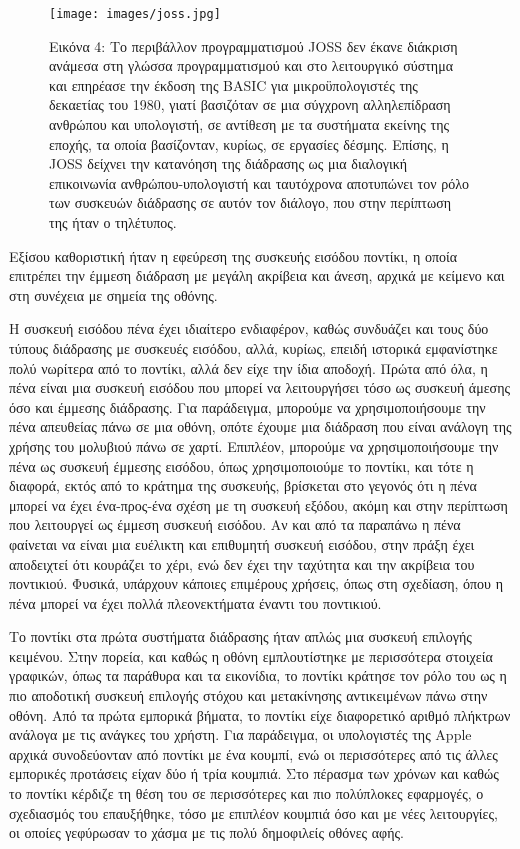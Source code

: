 \documentclass[
]{article}
\begin{document}
\leavevmode{}%
\begin{figure}
\hypertarget{fig:joss}{%
\centering
\texttt{[image: images/joss.jpg]}
\caption{Εικόνα 4: Το περιβάλλον προγραμματισμού JOSS δεν έκανε διάκριση
ανάμεσα στη γλώσσα προγραμματισμού και στο λειτουργικό σύστημα και
επηρέασε την έκδοση της BASIC για μικροϋπολογιστές της δεκαετίας του
1980, γιατί βασιζόταν σε μια σύγχρονη αλληλεπίδραση ανθρώπου και
υπολογιστή, σε αντίθεση με τα συστήματα εκείνης της εποχής, τα οποία
βασίζονταν, κυρίως, σε εργασίες δέσμης. Επίσης, η JOSS δείχνει την
κατανόηση της διάδρασης ως μια διαλογική επικοινωνία ανθρώπου-υπολογιστή
και ταυτόχρονα αποτυπώνει τον ρόλο των συσκευών διάδρασης σε αυτόν τον
διάλογο, που στην περίπτωση της ήταν ο τηλέτυπος.}\label{fig:joss}
}
\end{figure}

Εξίσου καθοριστική ήταν η εφεύρεση της συσκευής εισόδου ποντίκι, η οποία
επιτρέπει την έμμεση διάδραση με μεγάλη ακρίβεια και άνεση, αρχικά με
κείμενο και στη συνέχεια με σημεία της οθόνης.

Η συσκευή εισόδου πένα έχει ιδιαίτερο ενδιαφέρον, καθώς συνδυάζει και
τους δύο τύπους διάδρασης με συσκευές εισόδου, αλλά, κυρίως, επειδή
ιστορικά εμφανίστηκε πολύ νωρίτερα από το ποντίκι, αλλά δεν είχε την
ίδια αποδοχή. Πρώτα από όλα, η πένα είναι μια συσκευή εισόδου που μπορεί
να λειτουργήσει τόσο ως συσκευή άμεσης όσο και έμμεσης διάδρασης. Για
παράδειγμα, μπορούμε να χρησιμοποιήσουμε την πένα απευθείας πάνω σε μια
οθόνη, οπότε έχουμε μια διάδραση που είναι ανάλογη της χρήσης του
μολυβιού πάνω σε χαρτί. Επιπλέον, μπορούμε να χρησιμοποιήσουμε την πένα
ως συσκευή έμμεσης εισόδου, όπως χρησιμοποιούμε το ποντίκι, και τότε η
διαφορά, εκτός από το κράτημα της συσκευής, βρίσκεται στο γεγονός ότι η
πένα μπορεί να έχει ένα-προς-ένα σχέση με τη συσκευή εξόδου, ακόμη και
στην περίπτωση που λειτουργεί ως έμμεση συσκευή εισόδου. Αν και από τα
παραπάνω η πένα φαίνεται να είναι μια ευέλικτη και επιθυμητή συσκευή
εισόδου, στην πράξη έχει αποδειχτεί ότι κουράζει το χέρι, ενώ δεν έχει
την ταχύτητα και την ακρίβεια του ποντικιού. Φυσικά, υπάρχουν κάποιες
επιμέρους χρήσεις, όπως στη σχεδίαση, όπου η πένα μπορεί να έχει πολλά
πλεονεκτήματα έναντι του ποντικιού.

Το ποντίκι στα πρώτα συστήματα διάδρασης ήταν απλώς μια συσκευή επιλογής
κειμένου. Στην πορεία, και καθώς η οθόνη εμπλουτίστηκε με περισσότερα
στοιχεία γραφικών, όπως τα παράθυρα και τα εικονίδια, το ποντίκι κράτησε
τον ρόλο του ως η πιο αποδοτική συσκευή επιλογής στόχου και μετακίνησης
αντικειμένων πάνω στην οθόνη. Από τα πρώτα εμπορικά βήματα, το ποντίκι
είχε διαφορετικό αριθμό πλήκτρων ανάλογα με τις ανάγκες του χρήστη. Για
παράδειγμα, οι υπολογιστές της Apple αρχικά συνοδεύονταν από ποντίκι με
ένα κουμπί, ενώ οι περισσότερες από τις άλλες εμπορικές προτάσεις είχαν
δύο ή τρία κουμπιά. Στο πέρασμα των χρόνων και καθώς το ποντίκι κέρδιζε
τη θέση του σε περισσότερες και πιο πολύπλοκες εφαρμογές, ο σχεδιασμός
του επαυξήθηκε, τόσο με επιπλέον κουμπιά όσο και με νέες λειτουργίες, οι
οποίες γεφύρωσαν το χάσμα με τις πολύ δημοφιλείς οθόνες αφής.
\end{document}
